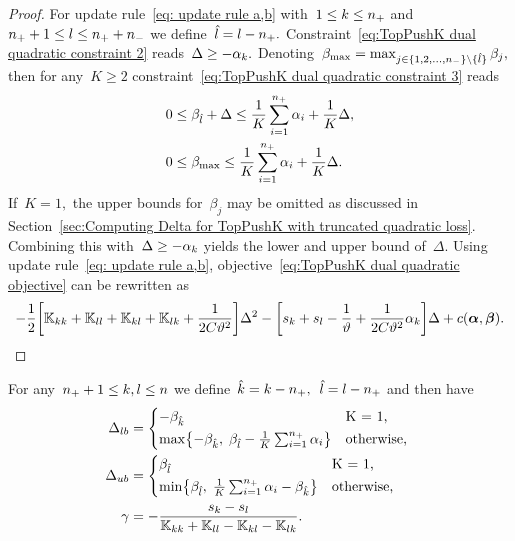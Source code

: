 \begin{proof}
  For update rule~\eqref{eq: update rule a,b} with~$1 \le k \le n_{+}$ and~$n_{+} + 1 \le l \le n_{+} + n_{-}$ we define~$\hat{l} = l - n_{+}.$ Constraint~\eqref{eq:TopPushK dual quadratic constraint 2} reads~$\Delta \geq - \alpha_k.$ Denoting~$\beta_{\max} = \max_{j \in \{1, 2, \ldots, n_{-} \} \setminus \{\hat{l}\}} \beta_j,$ then for any~$K \geq 2$ constraint~\eqref{eq:TopPushK dual quadratic constraint 3} reads
    \begin{equation}\label{eq: TopPushK dual quadratic a,b - bounds}
      \begin{aligned}
        0 & \leq \beta_{\hat{l}} + \Delta \leq \frac{1}{K} \sum_{i = 1}^{n_{+}} \alpha_i + \frac{1}{K} \Delta, \\
        0 & \leq \beta_{\max} \leq \frac{1}{K} \sum_{i = 1}^{n_{+}} \alpha_i + \frac{1}{K} \Delta.
      \end{aligned}
    \end{equation}
    If~$K = 1,$ the upper bounds for~$\beta_j$ may be omitted as discussed in Section~\ref{sec:Computing Delta for TopPushK with truncated quadratic loss}. Combining this with~$\Delta \geq - \alpha_k$ yields the lower and upper bound of~$\Delta.$ Using update rule~\eqref{eq: update rule a,b}, objective~\eqref{eq:TopPushK dual quadratic objective} can be rewritten as
    \begin{equation*}
      - \frac{1}{2} \Brac[s]{\K_{kk} + \K_{ll} + \K_{kl} + \K_{lk} + \frac{1}{2C\vartheta^2}} \Delta^2 - \Brac[s]{s_k + s_l - \frac{1}{\vartheta} + \frac{1}{2C\vartheta^2} \alphak} \Delta + c(\bm{\alpha}, \bm{\beta}).
    \end{equation*}
\end{proof}

\begin{lemma}
  For any~$n_{+} + 1\le k,l \le n$ we define~$\hat{k} = k - n_{+},$~$\hat{l} = l - n_{+}$ and then  have
  \begin{align*}
    \Delta_{lb} & = 
      \begin{cases*}
        -\betak & K = 1, \\
        \max \Brac[c]{- \betak,\; \betal - \frac{1}{K} \sum_{i = 1}^{\npos} \alpha_i} & \textrm{otherwise},
      \end{cases*} \\
    \Delta_{ub} & = 
      \begin{cases*}
        \betal & K = 1, \\
        \min \Brac[c]{\betal,\; \frac{1}{K} \sum_{i = 1}^{\npos} \alpha_i - \betak} & \textrm{otherwise},
      \end{cases*} \\
    \gamma & = -\frac{s_k - s_l}{\K_{kk} + \K_{ll} - \K_{kl} - \K_{lk}}.
  \end{align*}
\end{lemma}

